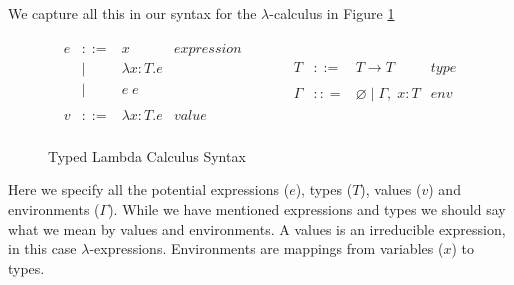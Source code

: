 \documentclass[11pt
              , a4paper
              , twoside
              , openright
              ]{report}
\numberwithin{case}{theorem}
\numberwithin{subcase}{case}
\begin{document}
We capture all this in our syntax for the $\lambda$-calculus in Figure \ref{f:lambda_syntax}
\begin{figure}[h]
\[
\begin{array}{lll}
\begin{array}{lllr}
e & ::= & x & expression \\
& | & \lambda x : T. e &\\
& | & e \; e &\\
&&\\
v & ::= & \lambda x : T. e & value\\
 \end{array}
& ~~~~~~
&
\begin{array}{lllr}
T & ::= & T \rightarrow T & type \\
&&\\
\Gamma & :: = & \varnothing \; | \; \Gamma,\; x : T & env \\
\end{array}
\end{array}
\]
\caption{Typed Lambda Calculus Syntax}
\label{f:lambda_syntax}
\end{figure}
Here we specify all the potential expressions ($e$), types ($T$), values ($v$) and environments ($\Gamma$). While we have mentioned expressions and types we should say what we mean by values and environments. A values is an irreducible expression, in this case $\lambda$-expressions. Environments are mappings from variables ($x$) to types. 
\end{document}
